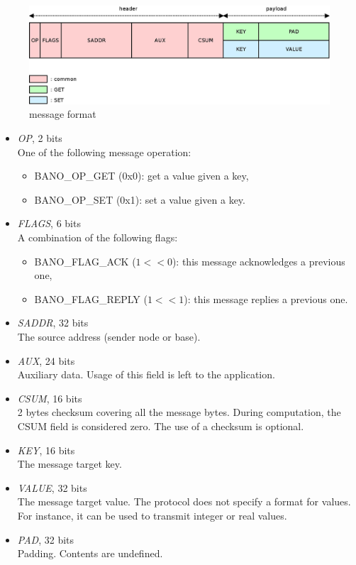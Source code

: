 \documentclass[a4paper, 11pt]{article}
\begin{document}
\paragraph{}
\begin{figure}[!h]
\begin{center}
\includegraphics[scale=0.2]{../dia/msg_format/main.jpeg}
\end{center}
\caption{\tiny{message format}}
\label{msg_format}
\end{figure}

\begin{itemize}
\item \textit{OP}, 2 bits\\
One of the following message operation:
\begin{itemize}
\item BANO\_OP\_GET (0x0): get a value given a key,
\item BANO\_OP\_SET (0x1): set a value given a key.
\end{itemize}
\item \textit{FLAGS}, 6 bits\\
A combination of the following flags:
\begin{itemize}
\item BANO\_FLAG\_ACK ($1<<0$): this message acknowledges a previous one,
\item BANO\_FLAG\_REPLY ($1<<1$): this message replies a previous one.
\end{itemize}
\item \textit{SADDR}, 32 bits\\
The source address (sender node or base).
\item \textit{AUX}, 24 bits\\
Auxiliary data. Usage of this field is left to the application.
\item \textit{CSUM}, 16 bits\\
2 bytes checksum covering all the message bytes. During computation,
the CSUM field is considered zero. The use of a checksum is optional.
\item \textit{KEY}, 16 bits\\
The message target key.
\item \textit{VALUE}, 32 bits\\
The message target value. The protocol does not specify a format for
values. For instance, it can be used to transmit integer or real values.
\item \textit{PAD}, 32 bits\\
Padding. Contents are undefined.
\end{itemize}
\end{document}
